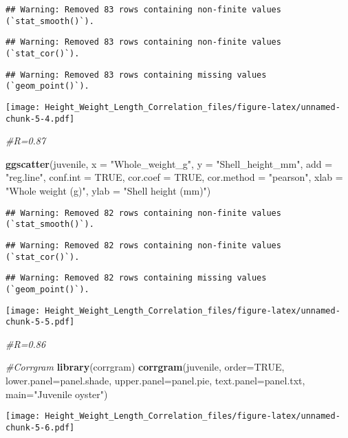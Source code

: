 \documentclass[
]{article}
\newenvironment{Shaded}{\begin{snugshade}}{\end{snugshade}}
\newcommand{\AttributeTok}[1]{\textcolor[rgb]{0.13,0.29,0.53}{#1}}
\newcommand{\CommentTok}[1]{\textcolor[rgb]{0.56,0.35,0.01}{\textit{#1}}}
\newcommand{\ConstantTok}[1]{\textcolor[rgb]{0.56,0.35,0.01}{#1}}
\newcommand{\FunctionTok}[1]{\textcolor[rgb]{0.13,0.29,0.53}{\textbf{#1}}}
\newcommand{\NormalTok}[1]{#1}
\newcommand{\StringTok}[1]{\textcolor[rgb]{0.31,0.60,0.02}{#1}}
\begin{document}
\begin{verbatim}
## Warning: Removed 83 rows containing non-finite values (`stat_smooth()`).
\end{verbatim}

\begin{verbatim}
## Warning: Removed 83 rows containing non-finite values (`stat_cor()`).
\end{verbatim}

\begin{verbatim}
## Warning: Removed 83 rows containing missing values (`geom_point()`).
\end{verbatim}

\texttt{[image: Height\_Weight\_Length\_Correlation\_files/figure-latex/unnamed-chunk-5-4.pdf]}

\begin{Shaded}
\begin{Highlighting}[]
\CommentTok{\#R=0.87}

\FunctionTok{ggscatter}\NormalTok{(juvenile, }\AttributeTok{x =} \StringTok{"Whole\_weight\_g"}\NormalTok{, }\AttributeTok{y =} \StringTok{"Shell\_height\_mm"}\NormalTok{, }
          \AttributeTok{add =} \StringTok{"reg.line"}\NormalTok{, }\AttributeTok{conf.int =} \ConstantTok{TRUE}\NormalTok{, }
          \AttributeTok{cor.coef =} \ConstantTok{TRUE}\NormalTok{, }\AttributeTok{cor.method =} \StringTok{"pearson"}\NormalTok{,}
          \AttributeTok{xlab =} \StringTok{"Whole weight (g)"}\NormalTok{, }\AttributeTok{ylab =} \StringTok{"Shell height (mm)"}\NormalTok{)}
\end{Highlighting}
\end{Shaded}

\begin{verbatim}
## Warning: Removed 82 rows containing non-finite values (`stat_smooth()`).
\end{verbatim}

\begin{verbatim}
## Warning: Removed 82 rows containing non-finite values (`stat_cor()`).
\end{verbatim}

\begin{verbatim}
## Warning: Removed 82 rows containing missing values (`geom_point()`).
\end{verbatim}

\texttt{[image: Height\_Weight\_Length\_Correlation\_files/figure-latex/unnamed-chunk-5-5.pdf]}

\begin{Shaded}
\begin{Highlighting}[]
\CommentTok{\#R=0.86}

\CommentTok{\#Corrgram}
\FunctionTok{library}\NormalTok{(corrgram)}
\FunctionTok{corrgram}\NormalTok{(juvenile, }\AttributeTok{order=}\ConstantTok{TRUE}\NormalTok{, }\AttributeTok{lower.panel=}\NormalTok{panel.shade,}
  \AttributeTok{upper.panel=}\NormalTok{panel.pie, }\AttributeTok{text.panel=}\NormalTok{panel.txt,}
  \AttributeTok{main=}\StringTok{"Juvenile oyster"}\NormalTok{)}
\end{Highlighting}
\end{Shaded}

\texttt{[image: Height\_Weight\_Length\_Correlation\_files/figure-latex/unnamed-chunk-5-6.pdf]}
\end{document}
